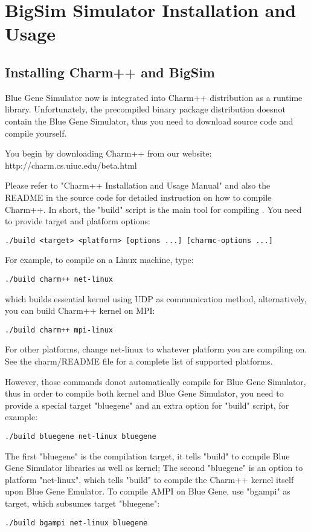 \section{BigSim Simulator Installation and Usage}
\label{install}

\subsection{Installing Charm++ and BigSim}

Blue Gene Simulator now is integrated into Charm++ distribution as a runtime 
library. Unfortunately, the precompiled binary package distribution doesnot 
contain the Blue Gene Simulator, thus you need to download source code
and compile yourself. 

You begin by downloading Charm++ from our website:
http://charm.cs.uiuc.edu/beta.html

Please refer to "Charm++ Installation and Usage Manual" and also the README
in the source code for detailed instruction on how to compile Charm++.
In short, the "build" script is the main tool for compiling \charmpp{}.
You need to provide target and platform options:
\begin{verbatim}
./build <target> <platform> [options ...] [charmc-options ...]
\end{verbatim}

For example, to compile on a Linux machine, type:
\begin{verbatim}
./build charm++ net-linux
\end{verbatim}

which builds essential \charmpp{} kernel using UDP as communication method, 
alternatively, you can build Charm++ kernel on MPI:
\begin{verbatim}
./build charm++ mpi-linux
\end{verbatim}

For other platforms, change net-linux to whatever platform you are compiling 
on. See the charm/README file for a complete list of supported platforms.

However, those commands donot automatically compile for Blue Gene Simulator, 
thus in order to compile both \charmpp{} kernel and Blue Gene Simulator, 
you need to provide a special target "bluegene" and an extra option for 
"build" script, for example:
\begin{verbatim}
./build bluegene net-linux bluegene
\end{verbatim}

The first "bluegene" is the compilation target, it tells "build" to
compile Blue Gene Simulator libraries as well as \charmpp{} kernel;
The second "bluegene" is an option to platform "net-linux", which tells
"build" to compile the Charm++ kernel itself upon Blue Gene Emulator. 
To compile AMPI on Blue Gene, use "bgampi" as target, which subsumes target
"bluegene":
\begin{verbatim}
./build bgampi net-linux bluegene
\end{verbatim}

